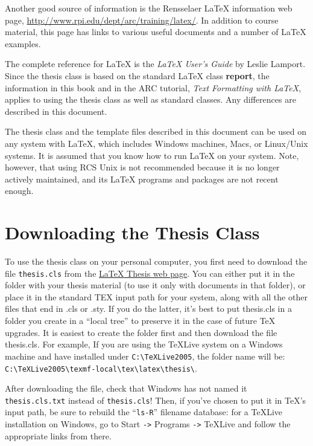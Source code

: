 \documentclass[letterpaper,11pt]{article}
\begin{document}
Another good source of information is the Rensselaer {\LaTeX} information web page,
\url{http://www.rpi.edu/dept/arc/training/latex/}. In addition to course material, this page
has links to various useful documents and a number of {\LaTeX} examples.

The complete reference for {\LaTeX} is the \textit{{\LaTeX} User's Guide} by Leslie Lamport. Since the
thesis class is based on the standard {\LaTeX} class \textbf{report}, the information in this book and
in the ARC tutorial, \textit{Text Formatting with {\LaTeX}}, applies to using the thesis class as well as
standard classes. Any differences are described in this document.

The thesis class and the template files described in this document can be used on any system
with {\LaTeX}, which includes Windows machines, Macs, or Linux/Unix systems. It is assumed
that you know how to run {\LaTeX} on your system. Note, however, that using RCS Unix is
not recommended because it is no longer actively maintained, and its {\LaTeX} programs and
packages are not recent enough.

\section{Downloading the Thesis Class}

To use the thesis class on your personal computer, you first need to download the file \verb|thesis.cls|
from the \href{https://dotcio.rpi.edu/services/printing-publishing/thesis-preparation}{{\LaTeX} Thesis web page}.
You can either put it in the folder with your thesis material
(to use it only with documents in that folder), or place it in the standard TEX input path
for your system, along with all the other files that end in .cls or .sty. If you do the latter, it's best to put thesis.cls in a folder you create in a ``local tree'' to preserve it in the
case of future TeX upgrades. It is easiest to create the folder first and then download the file
thesis.cls. For example, If you are using the TeXLive system on a Windows machine and
have installed under \verb|C:\TeXLive2005|, the folder name will be:
\verb|C:\TeXLive2005\texmf-local\tex\latex\thesis\|.

After downloading the file, check that Windows has not named it
\verb|thesis.cls.txt| instead of \verb|thesis.cls|! Then, if you've chosen to put it
in \TeX's input path, be sure to rebuild the ``\verb|ls-R|'' filename
database: for a {\TeX}Live installation on Windows, go to Start \verb|->|
Programs \verb|->| TeXLive and follow the appropriate links from
there.
\end{document}
